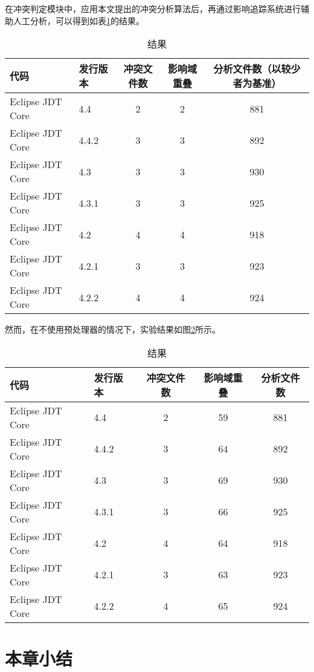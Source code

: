 在冲突判定模块中，应用本文提出的冲突分析算法后，再通过影响追踪系统进行辅助人工分析，可以得到如表\ref {data_compatible}的结果。

\begin{table}[H]
	\caption{结果}
	\label{data_compatible}
	\centering
	\begin{tabular}{llccc}
		\toprule[1.5pt]
		{\heiti 代码} & {\heiti 发行版本} & {\heiti 冲突文件数} & {\heiti 影响域重叠} & {\heiti 分析文件数（以较少者为基准）} \\\midrule[1pt]
		Eclipse JDT Core & 4.4 	& 2 & 2 & 881\\
		Eclipse JDT Core & 4.4.2 & 3 & 3 & 892\\
		Eclipse JDT Core & 4.3 	& 3 & 3 & 930\\
		Eclipse JDT Core & 4.3.1 & 3 & 3 & 925\\
		Eclipse JDT Core & 4.2 	& 4 & 4 & 918\\
		Eclipse JDT Core & 4.2.1 & 3  &	3 & 923\\
		Eclipse JDT Core & 4.2.2 & 4 & 4 & 924\\
		\bottomrule[1.5pt]
	\end{tabular}
\end{table}

然而，在不使用预处理器的情况下，实验结果如图\ref {data_compatible_2}所示。

\begin{table}[H]
	\caption{结果}
	\label{data_compatible_2}
	\centering
	\begin{tabular}{llccc}
		\toprule[1.5pt]
		{\heiti 代码} & {\heiti 发行版本} & {\heiti 冲突文件数} & {\heiti 影响域重叠} & {\heiti 分析文件数} \\\midrule[1pt]
		Eclipse JDT Core & 4.4 	& 2 & 59 &	881	\\
		Eclipse JDT Core & 4.4.2 & 3 & 64 &  892 \\
		Eclipse JDT Core & 4.3 	& 3 & 69 & 930 \\
		Eclipse JDT Core & 4.3.1 & 3 & 66 & 925\\
		Eclipse JDT Core & 4.2 	& 4 & 64 & 918	\\
		Eclipse JDT Core & 4.2.1 & 3 & 63 & 923\\
		Eclipse JDT Core & 4.2.2 & 4 & 65 & 924\\
		\bottomrule[1.5pt]
	\end{tabular}
\end{table}


\section{本章小结}